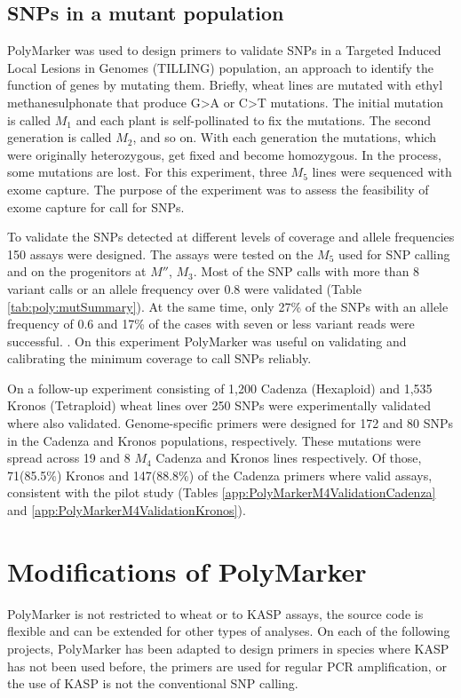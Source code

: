 \subsection{SNPs in a mutant population}
\label{sub:poly:muts}
PolyMarker was used to design primers to validate SNPs in a Targeted Induced Local Lesions in Genomes (TILLING) population, an approach to identify the function of genes by mutating them. 
Briefly, wheat lines are mutated with ethyl methanesulphonate that produce G>A or C>T mutations. 
The initial mutation is called $M_{1}$ and each plant is self-pollinated to fix the mutations. 
The second generation is called $M_{2}$, and so on. 
With each generation the mutations, which were originally heterozygous, get fixed and become homozygous. 
In the process, some mutations are lost. 
For this experiment, three $M_{5}$ lines were sequenced with exome capture. 
The purpose of the experiment was to assess the feasibility of exome capture for call for SNPs.  

To validate the SNPs detected at different levels of coverage and allele frequencies 150 assays were designed.
The assays were tested on the $M_{5}$ used for SNP calling and on the progenitors at $M''$, $M_{3}$. 
Most of the SNP calls with more than 8 variant calls or an allele frequency over 0.8 were validated (Table \ref{tab:poly:mutSummary}). 
At the same time, only 27\% of the SNPs with an allele frequency of 0.6 and 17\% of the cases with seven or less variant reads were successful. \citep{King2015}. 
On this experiment PolyMarker was useful on validating and calibrating the minimum coverage to call SNPs reliably. 



On a follow-up experiment consisting of 1,200 Cadenza (Hexaploid) and 1,535 Kronos (Tetraploid) wheat lines \citep{Krasileva2016} over 250 SNPs were experimentally validated where also validated. Genome-specific primers were designed for 172 and 80 SNPs in the Cadenza and Kronos populations, respectively. These mutations were spread across 19 and 8 $M_{4}$ Cadenza and Kronos lines respectively. 
Of those, 71(85.5\%) Kronos and 147(88.8\%) of the Cadenza primers where valid assays, consistent with the pilot study (Tables \ref{app:PolyMarkerM4ValidationCadenza} and \ref{app:PolyMarkerM4ValidationKronos}).  

\section{Modifications of PolyMarker}
PolyMarker is not restricted to wheat or to KASP assays, the source code is flexible and can be extended for other types of analyses. 
On each of the following projects, PolyMarker has been adapted to design primers in species where KASP has not been used before, the primers are used for regular PCR amplification, or the use of KASP is not the conventional SNP calling. 

